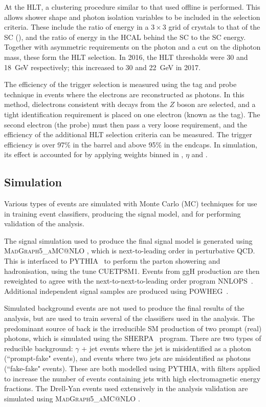 At the HLT, a clustering procedure similar to that used offline is performed. 
This allows shower shape and photon isolation variables to be included in the selection criteria.
These include the ratio of energy in a $3\times3$ grid of crystals to that of the SC (\RNINE), 
and the ratio of energy in the HCAL behind the SC to the SC energy.
Together with asymmetric requirements on the photon \pt and a cut on the diphoton mass, 
these form the HLT selection.
In 2016, the HLT \pt thresholds were 30 and \SI{18}{GeV} respectively;
this increased to 30 and \SI{22}{GeV} in 2017.

The efficiency of the trigger selection is measured using the tag and probe technique in \Zee events where the electrons are reconstructed as photons.
In this method, dielectrons consistent with decays from the $Z$ boson are selected, 
and a tight identification requirement is placed on one electron (known as the tag).
The second electron (the probe) must then pass a very loose requirement, 
and the efficiency of the additional HLT selection criteria can be measured.
The trigger efficiency is over 97\% in the barrel and above 95\% in the endcaps.
In simulation, its effect is accounted for by applying weights binned in \pt, $\eta$ and \RNINE.

\subsection{Simulation}

Various types of events are simulated with Monte Carlo (MC) techniques for use in training event classifiers, 
producing the signal model, and for performing validation of the analysis.

The signal simulation used to produce the final signal model is generated using \textsc{MadGraph5_{}aMC@NLO} \cite{Madgraph}, 
which is next-to-leading order in perturbative QCD.
This is interfaced to \textsc{PYTHIA}~\cite{pythia} to perform the parton showering and hadronisation, 
using the tune \textsc{CUETP8M1}.
Events from ggH production are then reweighted to agree with the next-to-next-to-leading order program \textsc{NNLOPS}~\cite{NNLOPS}.
Additional independent signal samples are produced using \textsc{POWHEG}~\cite{powheg}. %

Simulated background events are not used to produce the final results of the analysis, 
but are used to train several of the classifiers used in the analysis.
The predominant source of back is the irreducible SM production of two prompt (real) photons, 
which is simulated using the \textsc{SHERPA}~\cite{sherpa} program. %
There are two types of reducible background: $\gamma$ + jet events where the jet is misidentified as a photon (``prompt-fake" events), 
and events where two jets are misidentified as photons (``fake-fake" events).
These are both modelled using \textsc{PYTHIA}, 
with filters applied to increase the number of events containing jets with high electromagnetic energy fractions.
The Drell-Yan events used extensively in the analysis validation are simulated using \textsc{MadGraph5_{}aMC@NLO} \cite{Madgraph}. 

